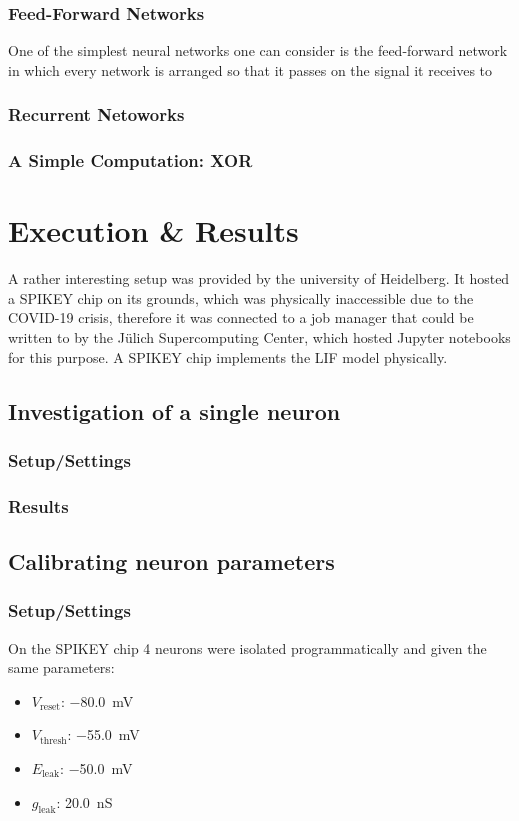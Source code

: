 \documentclass[a4paper]{article}
\begin{document}
\subsubsection{Feed-Forward Networks}
One of the simplest neural networks one can consider is the feed-forward
network in which every network is arranged so that it passes on the signal it
receives to

\subsubsection{Recurrent Netoworks}
\subsubsection{A Simple Computation: XOR}

\section{Execution \& Results}
A rather interesting setup was provided by the university of Heidelberg. It
hosted a SPIKEY chip on its grounds, which was physically inaccessible due to
the COVID-19 crisis, therefore it was connected to a job manager that could be
written to by the Jülich Supercomputing Center, which hosted Jupyter notebooks
for this purpose. A SPIKEY chip implements the LIF model physically.

\subsection{Investigation of a single neuron}
\subsubsection{Setup/Settings}
\subsubsection{Results}

\subsection{Calibrating neuron parameters}
\subsubsection{Setup/Settings}
On the SPIKEY chip 4 neurons were isolated programmatically and given the same
parameters:
\begin{itemize}
    \item $V_\text{reset}$: \SI{-80.0}{\milli\volt}
    \item $V_\text{thresh}$: \SI{-55.0}{\milli\volt}
    \item $E_\text{leak}$: \SI{-50.0}{\milli\volt}
    \item $g_\text{leak}$:  \SI{20.0}{\nano\siemens}
\end{itemize}
\end{document}
